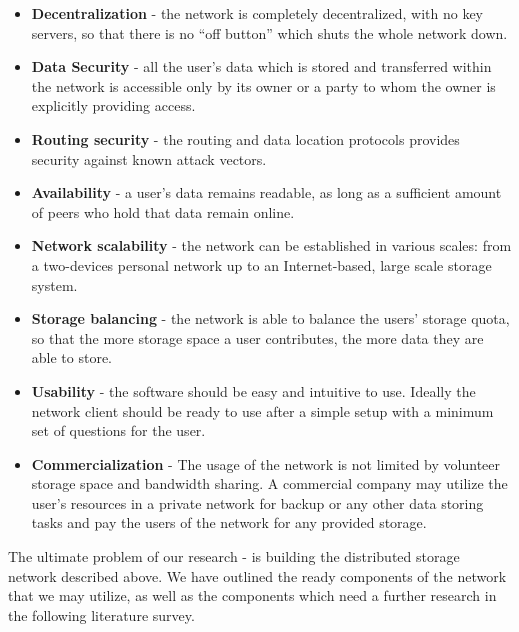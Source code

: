 \begin{itemize}
\item \textbf{Decentralization} - the network is completely decentralized,
      with no key servers, so that there is no ``off button'' which shuts
      the whole network down.
\item \textbf{Data Security} - all the user's data which is stored and transferred
      within the network is accessible only by its owner or a party to whom the
      owner is explicitly providing access.
\item \textbf{Routing security} - the routing and data location protocols
      provides security against known attack vectors.
\item \textbf{Availability} - a user's data remains readable,
      as long as a sufficient amount of peers who hold that data remain online.
\item \textbf{Network scalability} - the network can be established in various
      scales: from a two-devices personal network up to an Internet-based,
      large scale storage system.
\item \textbf{Storage balancing} - the network is able to balance the users'
      storage quota, so that the more storage space a user contributes,
      the more data they are able to store.
\item \textbf{Usability} - the software should be easy and intuitive to
      use. Ideally the network client should be ready to use after a
      simple setup with a minimum set of questions for the user.
\item \textbf{Commercialization} - The usage of the network is not limited
      by volunteer storage space and bandwidth sharing. A commercial company
      may utilize the user's resources in a private network for backup or any
      other data storing tasks and pay the users of the network for any
      provided storage.
\end{itemize}


The ultimate problem of our research - is building the distributed
storage network described above. We have outlined the ready
components of the network that we may utilize, as well as the
components which need a further research in the following literature
survey.


